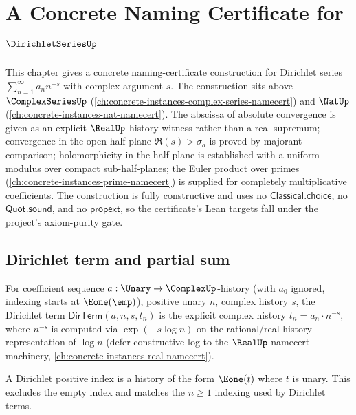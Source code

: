 \chapter{A Concrete Naming Certificate for \(\DirichletSeriesUp\)}
\label{ch:concrete-instances-dirichlet-series-namecert}

This chapter gives a concrete naming-certificate construction for Dirichlet series \(\sum_{n=1}^{\infty} a_n n^{-s}\) with complex argument \(s\). The construction sits above \(\ComplexSeriesUp\) (\autoref{ch:concrete-instances-complex-series-namecert}) and \(\NatUp\) (\autoref{ch:concrete-instances-nat-namecert}). The abscissa of absolute convergence is given as an explicit \(\RealUp\)-history witness rather than a real supremum; convergence in the open half-plane \(\Re(s) > \sigma_a\) is proved by majorant comparison; holomorphicity in the half-plane is established with a uniform modulus over compact sub-half-planes; the Euler product over primes (\autoref{ch:concrete-instances-prime-namecert}) is supplied for completely multiplicative coefficients. The construction is fully constructive and uses no \(\mathsf{Classical.choice}\), no \(\mathsf{Quot.sound}\), and no \(\mathsf{propext}\), so the certificate's Lean targets fall under the project's axiom-purity gate.

\section{Dirichlet term and partial sum}

\begin{definition}
\label{def:dir-term}
For coefficient sequence \(a : \Unary \to \ComplexUp\)-history (with \(a_0\) ignored, indexing starts at \(\Eone(\emp)\)), positive unary \(n\), complex history \(s\), the Dirichlet term \(\mathsf{DirTerm}(a, n, s, t_n)\) is the explicit complex history \(t_n = a_n \cdot n^{-s}\), where \(n^{-s}\) is computed via \(\exp(-s \log n)\) on the rational/real-history representation of \(\log n\) (defer constructive log to the \(\RealUp\)-namecert machinery, \autoref{ch:concrete-instances-real-namecert}).
\end{definition}

\begin{definition}
\label{def:dirichlet-positive-index}
A Dirichlet positive index is a history of the form \(\Eone(t)\) where \(t\) is
unary. This excludes the empty index and matches the \(n\geq 1\) indexing used
by Dirichlet terms.
\end{definition}

